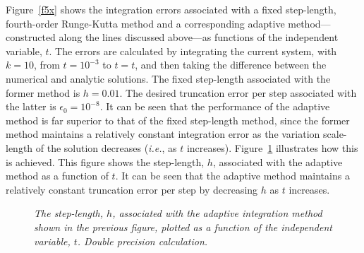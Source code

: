  Figure~\ref{f5x} shows the integration errors
associated with a fixed step-length, fourth-order Runge-Kutta
method and a corresponding adaptive method---con\-structed
along the lines discussed above---as functions of
the independent variable, $t$.   The errors are
calculated by integrating the current system, with $k=10$,
from $t=10^{-3}$ to $t=t$, and then taking the difference between the numerical and analytic
solutions. The fixed step-length associated with the former method is $h=0.01$. The desired
truncation error per step associated with the latter is $\epsilon_0=10^{-8}$. It
can be seen that the performance of the adaptive method is far
superior to that of the fixed step-length method, since the former method
maintains a relatively constant integration error as the variation scale-length
of the solution decreases ({\em i.e.}, as $t$ increases). Figure~\ref{f6x} illustrates how this is achieved. 
This figure shows the step-length, $h$, associated with the adaptive method as a function of $t$.
It can be seen that the adaptive method maintains a relatively constant
truncation  error per step by decreasing
$h$ as $t$ increases.

\begin{figure}
\epsfysize=3in
\centerline{}
\caption{\em  The step-length, $h$, associated with the
adaptive integration method shown in the previous figure, plotted as a function of the
independent variable, $t$. 
Double precision calculation.}\label{f6x}
\end{figure}

